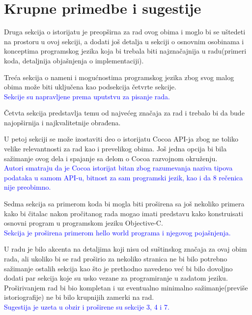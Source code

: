 \documentclass[a4paper]{report}
\newcommand{\odgovor}[1]{\textcolor{blue}{#1}}
\begin{document}
\section{Krupne primedbe i sugestije}
Druga sekcija o istorijatu je preopširna za rad ovog obima i moglo bi se uštedeti na prostoru u ovoj sekciji, a dodati još detalja u sekciji o osnovnim osobinama i konceptima programskog jezika koja bi trebala biti najznačajnija u radu(primeri koda, detaljnija objašnjenja o implementaciji).

Treća sekcija o nameni i mogućnostima programskog jezika zbog svog malog obima može biti uključena kao podsekcija četvrte sekcije. \\
\odgovor{Sekcije su napravljene prema uputstvu za pisanje rada.}

Četvta sekcija predstavlja temu od najvećeg značaja za rad i trebalo bi da bude najopširnija i najkvalitetnije obrađena.

U petoj sekciji se može izostaviti deo o istorijatu Cocoa API-ja zbog ne toliko velike relevantnosti za rad kao i prevelikog obima. Još jedna opcija bi bila sažimanje ovog dela i spajanje sa delom o Cocoa razvojnom okruženju. \\
\odgovor{Autori smatraju da je Cocoa istorijat bitan zbog razumevanja naziva tipova podataka u samom API-u, bitnost za sam programski jezik, kao i da 8 rečenica nije preobimno.}

Sedma sekcija sa primerom koda bi mogla biti proširena sa još nekoliko primera kako bi čitalac nakon pročitanog rada mogao imati predstavu kako konstruisati osnovni program u programskom jeziku Objective-C. \\
\odgovor{Sekcija je proširena primerom hello world programa i njegovog pojašnjenja.}

U radu je bilo akcenta na detaljima koji nisu od suštinskog značaja za ovaj obim rada, ali ukoliko bi se rad proširio za nekoliko stranica ne bi bilo potrebno sažimanje ostalih sekcija kao što je prethodno navedeno već bi bilo dovoljno dodati par sekcija koje su usko vezane za programiranje u zadatom jeziku. Proširivanjem rad bi bio kompletan i uz eventualno minimalno sažimanje(previše istoriografije) ne bi bilo krupnijih zamerki na rad.
\\
\odgovor{Sugestija je uzeta u obzir i proširene su sekcije 3, 4 i 7.}
\end{document}
